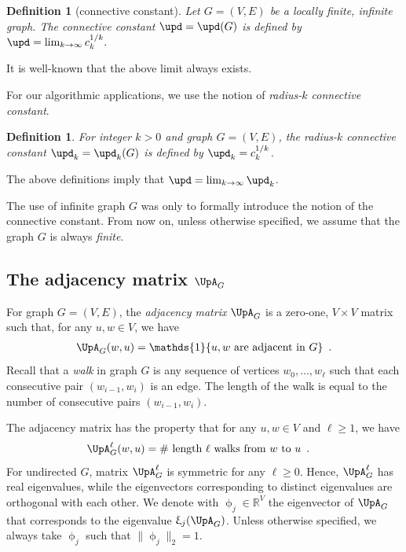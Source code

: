 \documentclass[11pt,reqno]{amsart}
\numberwithin{equation}{section}
\newtheorem{definition}[theorem]{Definition}
\newcommand{\applegreen}[1]{ {\color{applegreen}#1}}
\newcommand{\blue}[1]{{\color{blue}#1}}
\newcommand{\bluepigment}[1]{{\color{blue(pigment)}#1}}
\newcommand{\capri}[1]{{\color{capri}#1}}
\newcommand{\coquelicot}[1]{{\color{coquelicot}#1}}
\newcommand{\goldenbrown}[1]{{\color{goldenbrown}#1}}
\newcommand{\red}[1]{{\color{red}#1}}
\newcommand{\Ind}{\mathds{1}}
\newcommand{\cconnective}{\goldenbrown{\upd}}
\newcommand{\eigenval}{\upxi}
\newcommand{\norm}[2]{\goldenbrown{\|} #1 \goldenbrown{\|}_{#2}}
\newcommand{\Adjacency}{{\UpA}}
\newcommand{\eigenv}{\upphi}
\renewcommand{\applegreen}[1]{#1}
\renewcommand{\blue}[1]{#1}
\renewcommand{\bluepigment}[1]{#1}
\renewcommand{\capri}[1]{#1}
\renewcommand{\coquelicot}[1]{#1}
\renewcommand{\goldenbrown}[1]{#1}
\renewcommand{\red}[1]{#1}
\newcommand{\ki}{\capri{i}}
\newcommand{\kj}{\coquelicot{j}}
\newcommand{\kk}{\bluepigment{k}}
\newcommand{\kell}{{\color{green(pigment)}\ell}}%
\newcommand{\ku}{\red{u}}
\newcommand{\kw}{\blue{w}}
\renewcommand{\ki}{i}
\renewcommand{\kj}{j}
\renewcommand{\kk}{k}
\renewcommand{\kell}{\ell}
\renewcommand{\ku}{u}
\renewcommand{\kw}{w}
\begin{document}
\begin{definition}[connective constant]\label{def:CCInfinite}
Let $G=(V,E)$ be a locally finite, infinite graph. The connective constant $\cconnective=\cconnective(G)$ is defined by
$\cconnective = \lim_{\kk \to \infty}c^{1/\kk}_{\kk} .$
\end{definition}
It is well-known that the above limit always exists. 

For our algorithmic applications, we use  the notion of {\em radius-$\kk$ connective constant}. 
\begin{definition}\label{def:LocalCC}
For integer $\kk>0$ and graph $G=(V,E)$, the radius-$\kk$ connective constant $\cconnective_{\kk}=\cconnective_{\kk}(G)$ is defined by
$\cconnective_{\kk}= c^{1/\kk}_{\kk}$.
\end{definition}

The above definitions imply that $\cconnective=\lim_{\kk \to\infty} \cconnective_{\kk}$. 

The use of infinite graph $G$ was only to formally introduce  the notion of the connective constant. 
From now on,  unless otherwise specified,  we assume that the graph $G$ is always {\em finite}.


\subsection{The adjacency matrix $\Adjacency_G$}
For graph $G=(V,E)$, the {\em adjacency matrix} $\Adjacency_G$ is a zero-one, $V\times V$ matrix 
such that, for any $\ku,\kw\in V$, we have
\begin{align}\nonumber 
\Adjacency_G(\kw,\ku)= \Ind\{\textrm{$\ku, \kw$ are adjacent in $G$}\} \enspace.
\end{align}
%
Recall that a {\em walk} in  graph $G$ is any sequence of vertices $\kw_0, \ldots, \kw_{\kell}$ 
such that each consecutive pair $(\kw_{\ki-1}, \kw_{\ki})$ is an edge.
%
The length of the walk is equal to the number of consecutive pairs $(\kw_{\ki-1}, \kw_{\ki})$.

The adjacency matrix has the property that for any $\ku,\kw\in V$ and $\kell\geq 1$,
we have 
\begin{align}\label{eq:NoOfWalksVSA2L}
  \Adjacency^{\kell}_G (\kw,\ku)&=\textrm{$\#$ length $\kell$ walks\ from}\ \kw\ \textrm{to}\ \ku \enspace.
\end{align}
For undirected $G$, matrix $\Adjacency^{\kell}_G$ is symmetric for any $\kell\geq 0$. Hence, $\Adjacency^{\kell}_G$ has real eigenvalues, while 
the eigenvectors corresponding to distinct eigenvalues are orthogonal with each other. 
We denote with $\eigenv_{\kj} \in \mathbb{R}^V$ the eigenvector of $\Adjacency_G$ 
that corresponds to the eigenvalue $\eigenval_{\kj}(\Adjacency_G)$.
Unless otherwise specified, we always take $\eigenv_{\kj}$ such that $ \norm{ \eigenv_{\kj}}{2}=1$.
\end{document}
